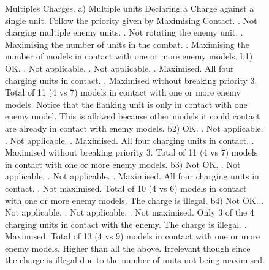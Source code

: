 \begin{figure}[!htbp]
\begin{minipage}{0.5\textwidth}
\def\svgwidth{\textwidth}

\end{minipage}\hfill\begin{minipage}{0.47\textwidth}
\caption{Multiples Charges.\captionpar
a) Multiple units Declaring a Charge against a single unit. Follow the priority given by Maximising Contact.\captionlist
{}. Not charging multiple enemy units.\newline
{}. Not rotating the enemy unit.\newline
{}. Maximising the number of units in the combat.\newline
{}. Maximising the number of models in contact with one or more enemy models.
\captionpar
b1) OK.\captionlist
{}. Not applicable.\newline
{}. Not applicable.\newline
{}. Maximised. All four charging units in contact.\newline
{}. Maximised without breaking priority 3. Total of 11 (4 vs 7) models in contact with one or more enemy models. Notice that the flanking unit is only in contact with one enemy model. This is allowed because other models it could contact are already in contact with enemy models.
\captionpar
b2) OK.\captionlist
{}. Not applicable.\newline
{}. Not applicable.\newline
{}. Maximised. All four charging units in contact.\newline
{}. Maximised without breaking priority 3. Total of 11 (4 vs 7) models in contact with one or more enemy models.
\captionpar
b3) Not OK.\captionlist
{}. Not applicable.\newline
{}. Not applicable.\newline
{}. Maximised. All four charging units in contact.\newline
{}. Not maximised. Total of 10 (4 vs 6) models in contact with one or more enemy models. The charge is illegal.
\captionpar
b4) Not OK.\captionlist
{}. Not applicable.\newline
{}. Not applicable.\newline
{}. Not maximised. Only 3 of the 4 charging units in contact with the enemy. The charge is illegal.\newline
{}. Maximised. Total of 13 (4 vs 9) models in contact with one or more enemy models. Higher than all the above. Irrelevant though since the charge is illegal due to the number of units not being maximised.
}
\label{figure/multiple_charges}
\end{minipage}
\end{figure}